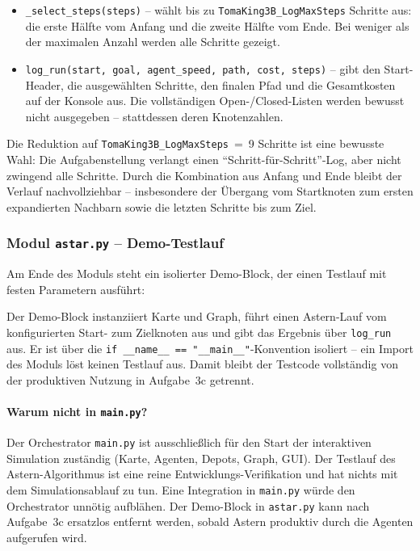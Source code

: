 

\begin{itemize}
    \item \texttt{\_select\_steps(steps)} -- wählt bis zu \texttt{TomaKing3B\_LogMaxSteps} Schritte aus: die erste Hälfte vom Anfang und die zweite Hälfte vom Ende. Bei weniger als der maximalen Anzahl werden alle Schritte gezeigt.
    \item \texttt{log\_run(start, goal, agent\_speed, path, cost, steps)} -- gibt den Start-Header, die ausgewählten Schritte, den finalen Pfad und die Gesamtkosten auf der Konsole aus. Die vollständigen Open-/Closed-Listen werden bewusst nicht ausgegeben -- stattdessen deren Knotenzahlen.
\end{itemize}

Die Reduktion auf \texttt{TomaKing3B\_LogMaxSteps}~=~9 Schritte ist eine bewusste Wahl: Die Aufgabenstellung verlangt einen ``Schritt-für-Schritt''-Log, aber nicht zwingend alle Schritte. Durch die Kombination aus Anfang und Ende bleibt der Verlauf nachvollziehbar -- insbesondere der Übergang vom Startknoten zum ersten expandierten Nachbarn sowie die letzten Schritte bis zum Ziel.


\subsubsection{Modul \texttt{astar.py} – Demo-Testlauf}

Am Ende des Moduls steht ein isolierter Demo-Block, der einen Testlauf mit festen Parametern ausführt:



Der Demo-Block instanziiert Karte und Graph, führt einen \acs{Astern}-Lauf vom konfigurierten Start- zum Zielknoten aus und gibt das Ergebnis über \texttt{log\_run} aus. Er ist über die \texttt{if \_\_name\_\_ == "\_\_main\_\_"}-Konvention isoliert -- ein Import des Moduls löst keinen Testlauf aus. Damit bleibt der Testcode vollständig von der produktiven Nutzung in Aufgabe~3c getrennt.

\paragraph{Warum nicht in \texttt{main.py}?}
Der Orchestrator \texttt{main.py} ist ausschließlich für den Start der interaktiven Simulation zuständig (Karte, Agenten, Depots, Graph, GUI). Der Testlauf des \acs{Astern}-Algorithmus ist eine reine Entwicklungs-Verifikation und hat nichts mit dem Simulationsablauf zu tun. Eine Integration in \texttt{main.py} würde den Orchestrator unnötig aufblähen. Der Demo-Block in \texttt{astar.py} kann nach Aufgabe~3c ersatzlos entfernt werden, sobald \acs{Astern} produktiv durch die Agenten aufgerufen wird.

